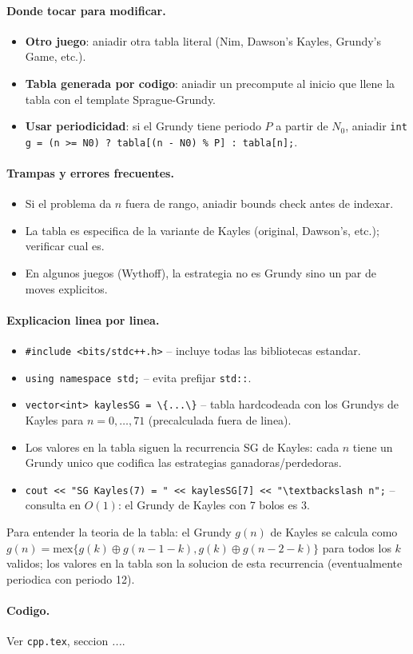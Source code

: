 \paragraph{Donde tocar para modificar.}
\begin{itemize}\setlength\itemsep{0pt}
	\item \textbf{Otro juego}: aniadir otra tabla literal (Nim, Dawson's Kayles, Grundy's Game, etc.).
	\item \textbf{Tabla generada por codigo}: aniadir un precompute al inicio que llene la tabla con el template Sprague-Grundy.
	\item \textbf{Usar periodicidad}: si el Grundy tiene periodo $P$ a partir de $N_0$, aniadir \texttt{int g = (n >= N0) ? tabla[(n - N0) \% P] : tabla[n];}.
\end{itemize}

\paragraph{Trampas y errores frecuentes.}
\begin{itemize}\setlength\itemsep{0pt}
	\item Si el problema da $n$ fuera de rango, aniadir bounds check antes de indexar.
	\item La tabla es especifica de la variante de Kayles (original, Dawson's, etc.); verificar cual es.
	\item En algunos juegos (Wythoff), la estrategia no es Grundy sino un par de moves explicitos.
\end{itemize}

\paragraph{Explicacion linea por linea.}
\begin{itemize}\setlength\itemsep{0pt}
	\item \verb|#include <bits/stdc++.h>| -- incluye todas las bibliotecas estandar.
	\item \verb|using namespace std;| -- evita prefijar \verb|std::|.
	\item \verb|vector<int> kaylesSG = \{...\}| -- tabla hardcodeada con los Grundys de Kayles para $n = 0, \dots, 71$ (precalculada fuera de linea).
	\item Los valores en la tabla siguen la recurrencia SG de Kayles: cada $n$ tiene un Grundy unico que codifica las estrategias ganadoras/perdedoras.
	\item \verb|cout << "SG Kayles(7) = " << kaylesSG[7] << "\textbackslash n";| -- consulta en $O(1)$: el Grundy de Kayles con 7 bolos es $3$.
\end{itemize}
Para entender la teoria de la tabla: el Grundy $g(n)$ de Kayles se calcula como $g(n) = \text{mex}\{g(k) \oplus g(n-1-k), g(k) \oplus g(n-2-k)\}$ para todos los $k$ validos; los valores en la tabla son la solucion de esta recurrencia (eventualmente periodica con periodo 12).

\paragraph{Codigo.}
Ver \texttt{cpp.tex}, seccion \textit{...}.
